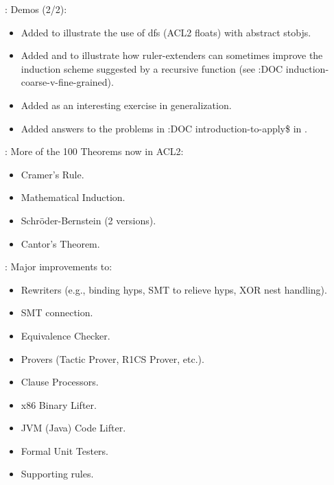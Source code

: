 \begin{frame}

\implibtitle

:
Demos (2/2):
\begin{itemize}
\item Added  to illustrate
      the use of dfs (ACL2 floats) with abstract stobjs.
\item Added  and
       to illustrate how
      ruler-extenders can sometimes improve the induction scheme
      suggested by a recursive function (see :DOC
      induction-coarse-v-fine-grained).
\item Added  as an interesting exercise in
      generalization.
\item Added answers to the problems in :DOC introduction-to-apply\$ in
      .
\end{itemize}

\end{frame}


\begin{frame}

\implibtitle

:
More of the 100 Theorems now in ACL2:
\begin{itemize}
\item Cramer's Rule.
\item Mathematical Induction.
\item Schr{\"o}der-Bernstein (2 versions).
\item Cantor's Theorem.
\end{itemize}

\end{frame}


\begin{frame}

\implibtitle

:
Major improvements to:
\begin{itemize}
\item Rewriters (e.g., binding hyps, SMT to relieve hyps, XOR nest handling).
\item SMT connection.
\item Equivalence Checker.
\item Provers (Tactic Prover, R1CS Prover, etc.).
\item Clause Processors.
\item x86 Binary Lifter.
\item JVM (Java) Code Lifter.
\item Formal Unit Testers.
\item Supporting rules.
\end{itemize}

\end{frame}

